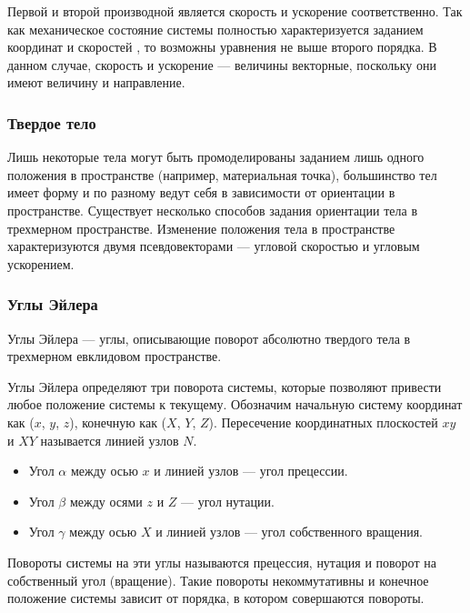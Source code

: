 Первой и второй производной является скорость и ускорение соответственно.
Так как механическое состояние системы полностью характеризуется заданием координат
и скоростей \cite[10]{Landau1}, то возможны уравнения не выше второго порядка. 
В данном случае, скорость и ускорение --- величины векторные, поскольку они имеют величину и направление.

\subsubsection{Твердое тело}
Лишь некоторые тела могут быть промоделированы заданием лишь одного положения в пространстве 
(например, материальная точка), большинство тел имеет форму и по разному ведут себя в зависимости
от ориентации в пространстве. Существует несколько способов задания ориентации тела в трехмерном
пространстве. Изменение положения тела в пространстве характеризуются двумя псевдовекторами ---
угловой скоростью и угловым ускорением.
\subsubsection{Углы Эйлера}
Углы Эйлера --- углы, описывающие поворот абсолютно твердого тела в трехмерном евклидовом пространстве.

Углы Эйлера определяют три поворота системы, которые позволяют привести любое положение системы к текущему.
Обозначим начальную систему координат как ($x$, $y$, $z$), конечную как ($X$, $Y$, $Z$).
Пересечение координатных плоскостей $xy$ и $XY$ называется линией узлов $N$.
\begin{itemize}
  \item Угол $\alpha$ между осью $x$ и линией узлов --- угол прецессии.
  \item Угол $\beta$ между осями $z$ и $Z$ --- угол нутации.
  \item Угол $\gamma$ между осью $X$ и линией узлов --- угол собственного вращения.
\end{itemize}
  
Повороты системы на эти углы называются прецессия, нутация и поворот на собственный угол (вращение).
Такие повороты некоммутативны и конечное положение системы зависит от порядка, в котором совершаются повороты. 

